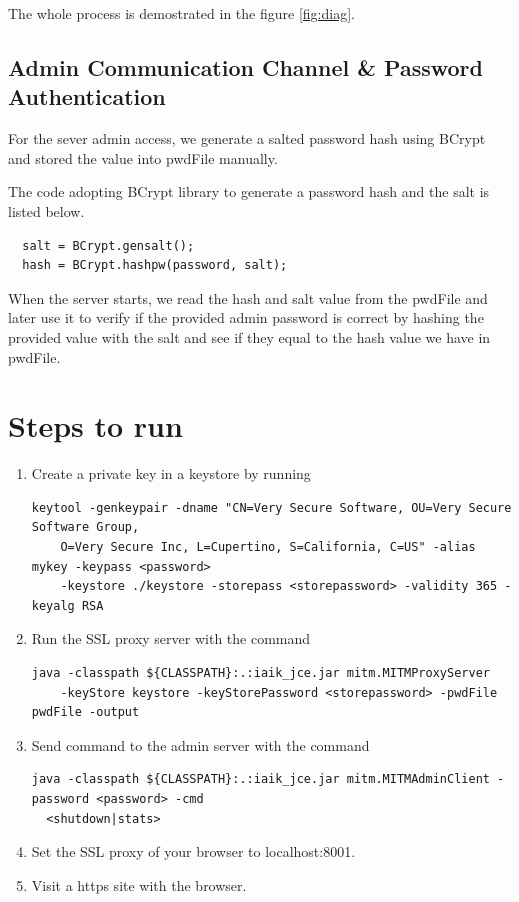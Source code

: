 The whole process is demostrated in the figure \ref{fig:diag}. 

\subsection{Admin Communication Channel \& Password Authentication} 
For the sever admin access, we generate a salted password hash using BCrypt and stored the value into pwdFile manually. 

The code adopting BCrypt library to generate a password hash and the salt is listed below. 
\begin{lstlisting}
  salt = BCrypt.gensalt();
  hash = BCrypt.hashpw(password, salt);
\end{lstlisting}

When the server starts, we read the hash and salt value from the pwdFile and later use it to verify if the provided admin password is correct by hashing the provided value with the salt and see if they equal to the hash value we have in pwdFile. 


\section{Steps to run}
\begin{enumerate}[(1)]
  \item Create a private key in a keystore by running 

\begin{lstlisting} 
keytool -genkeypair -dname "CN=Very Secure Software, OU=Very Secure Software Group, 
    O=Very Secure Inc, L=Cupertino, S=California, C=US" -alias mykey -keypass <password> 
    -keystore ./keystore -storepass <storepassword> -validity 365 -keyalg RSA
\end{lstlisting}

\item Run the SSL proxy server with the command 
\begin{lstlisting}
java -classpath ${CLASSPATH}:.:iaik_jce.jar mitm.MITMProxyServer 
    -keyStore keystore -keyStorePassword <storepassword> -pwdFile pwdFile -output
\end{lstlisting}

\item Send command to the admin server with the command 
\begin{lstlisting}
java -classpath ${CLASSPATH}:.:iaik_jce.jar mitm.MITMAdminClient -password <password> -cmd 
  <shutdown|stats>
\end{lstlisting}


\item Set the SSL proxy of your browser to localhost:8001.
\item Visit a https site with the browser.
\end{enumerate}


